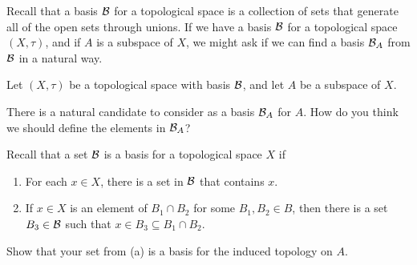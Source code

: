 \label{sec_base_sub}

Recall that a basis $\mathcal{B}$ for a topological space is a collection of sets that generate all of the open sets through unions. If we have a basis $\mathcal{B}$ for a topological space $(X, \tau)$, and if $A$ is a subspace of $X$, we might ask if we can find a basis $\mathcal{B}_A$ from $\mathcal{B}$ in a natural way.

\begin{activity} Let $(X, \tau)$ be a topological space with basis $\mathcal{B}$, and let $A$ be a subspace of $X$.
\ba
\item There is a natural candidate to consider as a basis $\mathcal{B}_A$ for $A$. How do you think we should define the elements in $\mathcal{B}_A$?

\item Recall that a set $\mathcal{B}$ is a basis for a topological space $X$ if
\begin{enumerate}
\item For each $x \in X$, there is a set in $\mathcal{B}$ that contains $x$.
\item If $x \in X$ is an element of $B_1 \cap B_2$ for some $B_1, B_2 \in B$, then there is a set $B_3 \in \mathcal{B}$ such that $x \in B_3 \subseteq B_1 \cap B_2$. 
\end{enumerate}
Show that your set from (a) is a basis for the induced topology on $A$.

\ea

\end{activity}

\begin{comment}

\ActivitySolution

\ba
\item It is reasonable to define $\B_A$ as 
\[\B_A = \{B \cap A \mid B \in \B\}.\]

\item Let $a \in A$. Then $a \in X$ so there is a set $B \in \B$ such that $a \in B$. Then $a \in B \cap A$, so $\B_A$ satisfies the first condition of a basis. 

Now suppose $a \in A$ and that $a \in B_1 \cap B_2$ for some $B_1$ and $B_2$ in $\B_A$. By definition of $\B_A$, there are sets $C_1$ and $C_2$ in $\B$ such that $B_1 = A \cap C_1$ and $B_2 = A \cap C_2$. The fact that $\B$ is a basis for $X$ means that there is a set $C_3 \in \B$ such that $a \in C_3 \subseteq C_1 \cap C_2$.   Let $B_3 = A \cap C_3$. Then $a \in B_3$ and 
\[B_3 = A \cap C_3 \subseteq A \cap (C_1 \cap C_2) = (A \cap C_1) \cap (A \cap C_2) = B_1 \cap B_2.\]
It follows that $\B_A$ is a basis for the relative topology on $A$. 

\ea

\end{comment}
 

